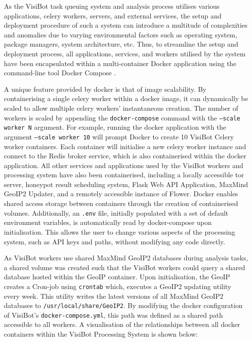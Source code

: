As the VisiBot task queuing system and analysis process utilises various applications, celery workers, servers, and external services, the setup and deployment procedure of such a system can introduce a multitude of complexities and anomalies due to varying environmental factors such as operating system, package managers, system architecture, etc. Thus, to streamline the setup and deployment process, all applications, services, and workers utilised by the system have been encapsulated within a multi-container Docker application using the command-line tool Docker Compose \citep{DockerCompose}. 

A unique feature provided by docker is that of image scalability. By containerising a single celery worker within a docker image, it can dynamically be scaled to allow multiple celery workers' instantaneous creation. The number of workers is scaled by appending the \texttt{docker-compose} command with the \texttt{--scale worker N} argument. For example, running the docker application with the argument \texttt{--scale worker 10} will prompt Docker to create 10 VisiBot Celery worker containers. Each container will initialise a new celery worker instance and connect to the Redis broker service, which is also containerised within the docker application. All other services and applications used by the VisiBot workers and processing system have also been containerised, including a locally accessible tor server, honeypot result scheduling system, Flask Web API Application, MaxMind GeoIP2 Updater, and a remotely accessible instance of Flower. Docker enables shared access storage between containers through the creation of containerised volumes. Additionally, an \texttt{.env} file, initially populated with a set of default environment variables, is automatically read by docker-compose upon initialisation. This allows the user to change various aspects of the processing system, such as API keys and paths, without modifying any code directly.

As VisiBot workers use shared MaxMind GeoIP2 databases \citep{MaxMind} during analysis tasks, a shared volume was created such that the VisiBot workers could query a shared database hosted within the GeoIP container. Upon initialisation, the GeoIP creates a Cron-job using \texttt{crontab} \citep{Crontab} which, executes a GeoIP2 updating utility every week. This utility writes the latest versions of all MaxMind GeoIP2 databases to \texttt{/usr/local/share/GeoIP2}. By modifying the docker configuration of VisiBot's \texttt{docker-compose.yml}, this path was defined as a shared path accessible to all workers. A visualisation of the relationships between all docker containers within the VisiBot Processing System is shown below:



